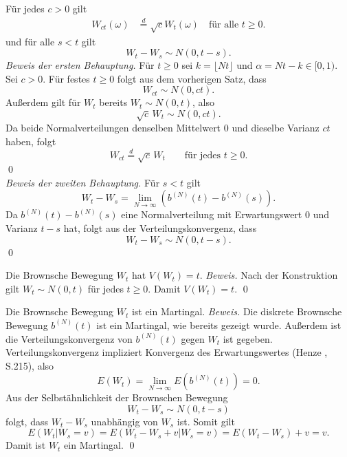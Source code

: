 \begin{lemma}
Für jedes $c > 0$ gilt
$$
\begin{aligned}
W_{ct}(\omega) &\stackrel{d}{=} \sqrt{c} W_t(\omega) \quad \text{für alle } t \ge 0.
\end{aligned}
$$
und für alle $s \lt t$ gilt
$$
W_t - W_s \sim N(0, t-s).
$$
\textit{Beweis der ersten Behauptung.}
Für $t \ge 0$ sei $k = \lfloor Nt \rfloor$ und $\alpha = Nt - k \in [0,1)$.
Sei $c>0$. Für festes $t\ge0$ folgt aus dem vorherigen Satz, dass
$$W_{ct}\sim N(0,ct).$$
Außerdem gilt für $W_t$ bereits $W_t\sim N(0,t)$, also
$$\sqrt{c}\,W_t\sim N(0,c t).$$
Da beide Normalverteilungen denselben Mittelwert $0$ und dieselbe Varianz $ct$ haben, folgt
$$W_{ct}\stackrel{d}{=}\sqrt{c}\,W_t\qquad\text{für jedes }t\ge0.$$
\qed \\
\textit{Beweis der zweiten Behauptung.}
Für $s < t$ gilt
$$
W_t - W_s = \lim_{N \to \infty} \left( b^{(N)}(t) - b^{(N)}(s) \right).
$$
Da $b^{(N)}(t) - b^{(N)}(s)$ eine Normalverteilung mit Erwartungswert $0$ und Varianz $t-s$ hat, folgt aus der Verteilungskonvergenz, dass
$$
W_t - W_s \sim N(0, t-s).
$$
\qed

\end{lemma}

\begin{satz}
Die Brownsche Bewegung $W_t$ hat $V(W_t)=t$.
\textit{Beweis.} Nach der Konstruktion gilt $W_t\sim N(0,t)$ für jedes $t\ge0$.
Damit $V(W_t)=t$. \qed
\end{satz}

\begin{satz}
Die Brownsche Bewegung $W_t$ ist ein Martingal.
\textit{Beweis.}
Die diskrete Brownsche Bewegung $b^{(N)}(t)$ ist ein Martingal, wie bereits gezeigt wurde.
Außerdem ist die Verteilungskonvergenz von $b^{(N)}(t)$ gegen $W_t$ ist gegeben.
Verteilungskonvergenz impliziert Konvergenz des Erwartungswertes (Henze \cite{henze}, S.215), also
$$
E(W_t) = \lim_{N \to \infty} E(b^{(N)}(t)) = 0.
$$
Aus der Selbstähnlichkeit der Brownschen Bewegung $$W_t - W_s \sim N(0, t-s)$$
folgt, dass $W_t - W_s$ unabhängig von $W_s$ ist. Somit gilt
$$
E(W_t | W_s = v) = E(W_t - W_s + v | W_s = v) = E(W_t - W_s) + v = v.
$$
Damit ist $W_t$ ein Martingal. \qed
\end{satz}